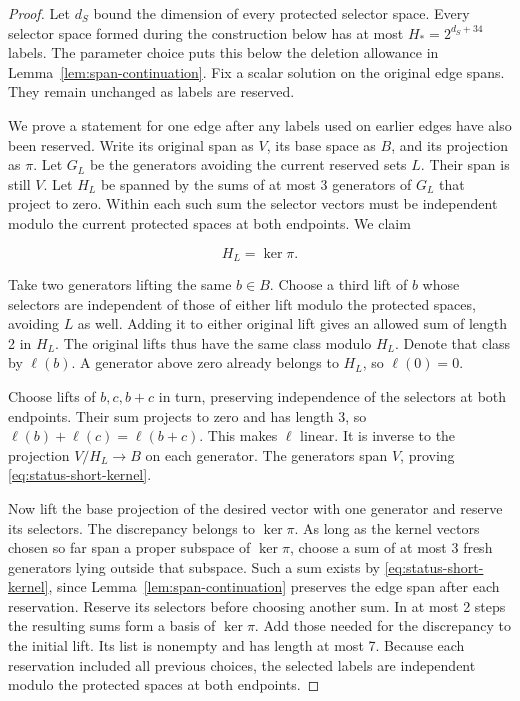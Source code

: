 \begin{proof}
Let $d_S$ bound the dimension of every protected selector space.
Every selector space formed during the construction below has at most
$H_*=2^{d_S+34}$ labels. The parameter choice puts this below the
deletion allowance in Lemma~\ref{lem:span-continuation}. Fix a scalar solution
on the original edge spans. They remain unchanged as labels are reserved.

We prove a statement for one edge after any labels used on earlier
edges have also been reserved. Write its original span as $V$, its
base space as $B$, and its projection as $\pi$. Let $G_L$ be the
generators avoiding the current reserved sets $L$. Their span is still
$V$. Let \(H_L\) be spanned by the sums of at most 3 generators of \(G_L\)
that project to zero. Within each such sum the selector vectors must be
independent modulo the current protected spaces at both endpoints.
We claim

\begin{equation}
\label{eq:status-short-kernel}
H_L=\ker\pi.
\end{equation}

Take two generators lifting the same \(b\in B\). Choose a third
lift of \(b\) whose selectors are independent of those of either lift
modulo the protected spaces, avoiding \(L\) as well. Adding it to
either original lift gives an allowed sum of length 2 in \(H_L\).
The original lifts thus have the same class modulo \(H_L\). Denote
that class by \(\ell(b)\). A generator above zero already belongs to
\(H_L\), so \(\ell(0)=0\).

Choose lifts of \(b,c,b+c\) in turn, preserving independence of the
selectors at both endpoints. Their sum projects to zero and has length
3, so \(\ell(b)+\ell(c)=\ell(b+c)\). This makes \(\ell\) linear.
It is inverse to the projection \(V/H_L\to B\) on each generator.
The generators span \(V\), proving \eqref{eq:status-short-kernel}.

Now lift the base projection of the desired vector with one generator
and reserve its selectors. The discrepancy belongs to \(\ker\pi\).
As long as the kernel vectors chosen so far span a proper subspace
of \(\ker\pi\), choose a sum of at most 3 fresh generators lying
outside that subspace. Such a sum exists by
\eqref{eq:status-short-kernel}, since Lemma~\ref{lem:span-continuation}
preserves the edge span after each reservation. Reserve its selectors
before choosing another sum. In at most 2 steps the resulting sums
form a basis of \(\ker\pi\). Add those needed for the discrepancy
to the initial lift. Its list is nonempty and has length at most 7.
Because each reservation included all previous choices, the selected
labels are independent modulo the protected spaces at both endpoints.


\end{proof}
